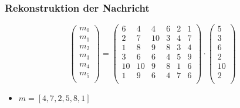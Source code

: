 \documentclass[11pt,aspectratio=169]{beamer}
\begin{document}
	\begin{frame}
		\frametitle{Rekonstruktion der Nachricht}
		
		\[
		\begin{pmatrix}
			m_0 \\ m_1 \\ m_2 \\ m_3 \\ m_4 \\ m_5 \\
		\end{pmatrix}
		=
		\begin{pmatrix}
			6&  4&  4&  6& 2&  1\\
			2&  7& 10&  3& 4&  7\\
			1&  8&  9&  8& 3&  4\\
			3&  6&  6&  4& 5&  9\\
			10& 10&  9&  8& 1&  6\\
			1&  9&  6&  4& 7&  6\\
		\end{pmatrix}
		\cdot
		\begin{pmatrix}
			5 \\ 3 \\ 6 \\ 2 \\ 10 \\ 2 \\
		\end{pmatrix}
		\]
		
		\begin{itemize}
			\item $m = [4,7,2,5,8,1]$
		\end{itemize}
		
	\end{frame}
\end{document}

